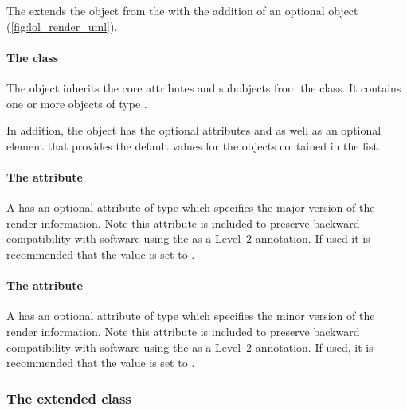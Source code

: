 The \RenderPackage extends the  object from the \LayoutPackage with the
addition of an optional \ListOfGlobalRenderInformation object (\ref{fig:lol_render_uml}).

\paragraph{The  class}
\label{listofglobalrenderinformation-class}

The \ListOfGlobalRenderInformation object inherits the core attributes and subobjects from the
 class. It contains one or more objects of type
\GlobalRenderInformation.

In addition, the \ListOfGlobalRenderInformation object has the optional attributes 
 and  as well as an optional \DefaultValues 
element that provides the default values for the \GlobalRenderInformation objects
contained in the list.

\paragraph{The \fixttspace{} attribute}

A \ListOfGlobalRenderInformation has an optional attribute
 of type  which specifies the major version of the render information.  Note this attribute is included to preserve backward compatibility with software using the \RenderPackage as a Level~2 annotation. If used it is recommended that the value is set to .
 
\paragraph{The \fixttspace{} attribute}

A \ListOfGlobalRenderInformation has an optional attribute
 of type  which specifies the minor version of the render information.  Note this attribute is included to preserve backward compatibility with software using the \RenderPackage as a Level~2 annotation. If used, it is recommended that the value is set to .
 

\subsubsection{The extended  class}
\label{layout-class}

